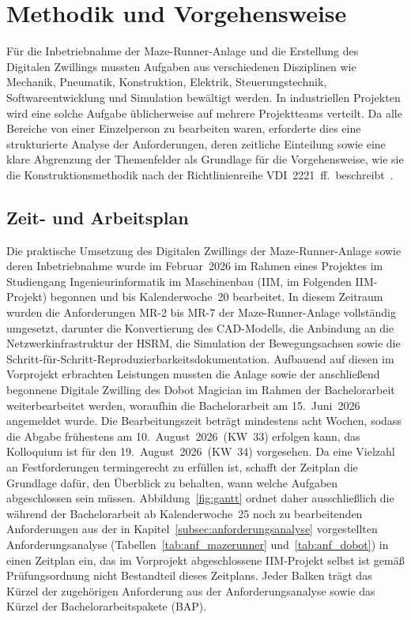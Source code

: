 \section{Methodik und Vorgehensweise}
\label{sec:methodik}

Für die Inbetriebnahme der Maze-Runner-Anlage und die Erstellung des Digitalen Zwillings
mussten Aufgaben aus verschiedenen Disziplinen wie Mechanik, Pneumatik, Konstruktion,
Elektrik, Steuerungstechnik, Softwareentwicklung und Simulation bewältigt werden.
In industriellen Projekten wird eine solche Aufgabe üblicherweise auf mehrere
Projektteams verteilt.
Da alle Bereiche von einer Einzelperson zu bearbeiten waren, erforderte dies eine
strukturierte Analyse der Anforderungen, deren zeitliche Einteilung sowie eine klare
Abgrenzung der Themenfelder als Grundlage für die Vorgehensweise, wie sie die
Konstruktionsmethodik nach der Richtlinienreihe VDI~2221~ff.\ beschreibt~\cite{vdi_konstruktionsmethodik}.

\subsection{Zeit- und Arbeitsplan}
Die praktische Umsetzung des Digitalen Zwillings der Maze-Runner-Anlage sowie
deren Inbetriebnahme wurde im Februar~2026 im Rahmen eines Projektes im Studiengang
Ingenieurinformatik im Maschinenbau (IIM, im Folgenden IIM-Projekt) begonnen und bis
Kalenderwoche~20 bearbeitet.
In diesem Zeitraum wurden die Anforderungen MR-2 bis MR-7 der Maze-Runner-Anlage
vollständig umgesetzt, darunter die Konvertierung des CAD-Modells, die Anbindung an
die Netzwerkinfrastruktur der HSRM, die Simulation der Bewegungsachsen sowie die
Schritt-für-Schritt-Reproduzierbarkeitsdokumentation.
Aufbauend auf diesen im Vorprojekt erbrachten Leistungen mussten die Anlage sowie der
anschließend begonnene Digitale Zwilling des Dobot Magician im Rahmen der
Bachelorarbeit weiterbearbeitet werden, woraufhin die Bachelorarbeit am 15.~Juni~2026
angemeldet wurde.
Die Bearbeitungszeit beträgt mindestens acht Wochen, sodass die Abgabe frühestens
am 10.~August~2026~(KW~33) erfolgen kann, das Kolloquium ist für den
19.~August~2026~(KW~34) vorgesehen.
Da eine Vielzahl an Festforderungen termingerecht zu erfüllen ist, schafft der Zeitplan die Grundlage dafür, den Überblick zu behalten, wann welche Aufgaben abgeschlossen sein müssen.
Abbildung~\ref{fig:gantt} ordnet daher ausschließlich die während der Bachelorarbeit
ab Kalenderwoche~25 noch zu bearbeitenden Anforderungen aus der in
Kapitel~\ref{subsec:anforderungsanalyse} vorgestellten Anforderungsanalyse
(Tabellen~\ref{tab:anf_mazerunner} und~\ref{tab:anf_dobot}) in einen Zeitplan ein,
das im Vorprojekt abgeschlossene IIM-Projekt selbst ist gemäß Prüfungsordnung nicht
Bestandteil dieses Zeitplans.
Jeder Balken trägt das Kürzel der zugehörigen Anforderung aus der Anforderungsanalyse sowie das Kürzel der Bachelorarbeitspakete (BAP).

